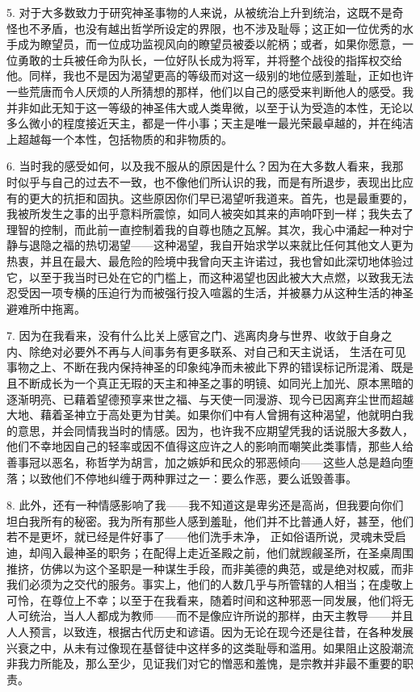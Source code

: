 5. 对于大多数致力于研究神圣事物的人来说，从被统治上升到统治，这既不是奇怪也不矛盾，也没有越出哲学所设定的界限，也不涉及耻辱；这正如一位优秀的水手成为瞭望员，而一位成功监视风向的瞭望员被委以舵柄；或者，如果你愿意，一位勇敢的士兵被任命为队长，一位好队长成为将军，并将整个战役的指挥权交给他。同样，我也不是因为渴望更高的等级而对这一级别的地位感到羞耻，正如也许一些荒唐而令人厌烦的人所猜想的那样，他们以自己的感受来判断他人的感受。我并非如此无知于这一等级的神圣伟大或人类卑微，以至于认为受造的本性，无论以多么微小的程度接近天主，都是一件小事；天主是唯一最光荣最卓越的，并在纯洁上超越每一个本性，包括物质的和非物质的。\par

6. 当时我的感受如何，以及我不服从的原因是什么？因为在大多数人看来，我那时似乎与自己的过去不一致，也不像他们所认识的我，而是有所退步，表现出比应有的更大的抗拒和固执。这些原因你们早已渴望听我道来。首先，也是最重要的，我被所发生之事的出乎意料所震惊，如同人被突如其来的声响吓到一样；我失去了理智的控制，而此前一直控制着我的自尊也随之瓦解。其次，我心中涌起一种对宁静与退隐之福的热切渴望——这种渴望，我自开始求学以来就比任何其他文人更为热衷，并且在最大、最危险的险境中我曾向天主许诺过，我也曾如此深切地体验过它，以至于我当时已处在它的门槛上，而这种渴望也因此被大大点燃，以致我无法忍受因一项专横的压迫行为而被强行投入喧嚣的生活，并被暴力从这种生活的神圣避难所中拖离。\par

7. 因为在我看来，没有什么比关上感官之门、逃离肉身与世界、收敛于自身之内、除绝对必要外不再与人间事务有更多联系、对自己和天主说话， 生活在可见事物之上、不断在我内保持神圣的印象纯净而未被此下界的错误标记所混淆、既是且不断成长为一个真正无瑕的天主和神圣之事的明镜、如同光上加光、原本黑暗的逐渐明亮、已藉着望德预享来世之福、与天使一同漫游、现今已因离弃尘世而超越大地、藉着圣神立于高处更为甘美。如果你们中有人曾拥有这种渴望，他就明白我的意思，并会同情我当时的情感。因为，也许我不应期望凭我的话说服大多数人，他们不幸地因自己的轻率或因不值得这应许之人的影响而嘲笑此类事情，那些人给善事冠以恶名，称哲学为胡言，加之嫉妒和民众的邪恶倾向——这些人总是趋向堕落；以致他们不停地纠缠于两种罪过之一：要么作恶，要么诋毁善事。\par

8. 此外，还有一种情感影响了我——我不知道这是卑劣还是高尚，但我要向你们坦白我所有的秘密。我为所有那些人感到羞耻，他们并不比普通人好，甚至，他们若不是更坏，就已经是件好事了——他们洗手未净， 正如俗语所说，灵魂未受启迪，却闯入最神圣的职务；在配得上走近圣殿之前，他们就觊觎圣所，在圣桌周围推挤，仿佛以为这个圣职是一种谋生手段，而非美德的典范，或是绝对权威，而非我们必须为之交代的服务。事实上，他们的人数几乎与所管辖的人相当；在虔敬上可怜，在尊位上不幸；以至于在我看来，随着时间和这种邪恶一同发展，他们将无人可统治，当人人都成为教师——而不是像应许所说的那样，由天主教导——并且人人预言，以致连，根据古代历史和谚语。因为无论在现今还是往昔，在各种发展兴衰之中，从未有过像现在基督徒中这样多的这类耻辱和滥用。如果阻止这股潮流非我力所能及，那么至少，见证我们对它的憎恶和羞愧，是宗教并非最不重要的职责。\par

